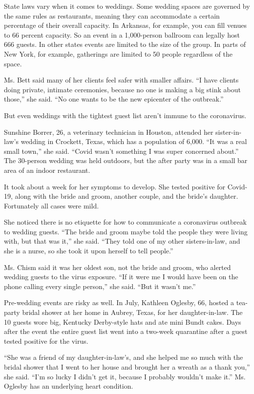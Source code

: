 State laws vary when it comes to weddings. Some wedding spaces are
governed by the same rules as restaurants, meaning they can accommodate
a certain percentage of their overall capacity. In Arkansas, for
example, you can fill venues to 66 percent capacity. So an event in a
1,000-person ballroom can legally host 666 guests. In other states
events are limited to the size of the group. In parts of New York, for
example, gatherings are limited to 50 people regardless of the space.

Ms. Bett said many of her clients feel safer with smaller affairs. ``I
have clients doing private, intimate ceremonies, because no one is
making a big stink about those,'' she said. ``No one wants to be the new
epicenter of the outbreak.''

But even weddings with the tightest guest list aren't immune to the
coronavirus.

Sunshine Borrer, 26, a veterinary technician in Houston, attended her
sister-in-law's wedding in Crockett, Texas, which has a population of
6,000. ``It was a real small town,'' she said. ``Covid wasn't something
I was super concerned about.'' The 30-person wedding was held outdoors,
but the after party was in a small bar area of an indoor restaurant.

It took about a week for her symptoms to develop. She tested positive
for Covid-19, along with the bride and groom, another couple, and the
bride's daughter. Fortunately all cases were mild.

She noticed there is no etiquette for how to communicate a coronavirus
outbreak to wedding guests. ``The bride and groom maybe told the people
they were living with, but that was it,'' she said. ``They told one of
my other sisters-in-law, and she is a nurse, so she took it upon herself
to tell people.''

Ms. Chism said it was her oldest son, not the bride and groom, who
alerted wedding guests to the virus exposure. ``If it were me I would
have been on the phone calling every single person,'' she said. ``But it
wasn't me.''

Pre-wedding events are risky as well. In July, Kathleen Oglesby, 66,
hosted a tea-party bridal shower at her home in Aubrey, Texas, for her
daughter-in-law. The 10 guests wore big, Kentucky Derby-style hats and
ate mini Bundt cakes. Days after the event the entire guest list went
into a two-week quarantine after a guest tested positive for the virus.

``She was a friend of my daughter-in-law's, and she helped me so much
with the bridal shower that I went to her house and brought her a wreath
as a thank you,'' she said. ``I'm so lucky I didn't get it, because I
probably wouldn't make it.'' Ms. Oglesby has an underlying heart
condition.

